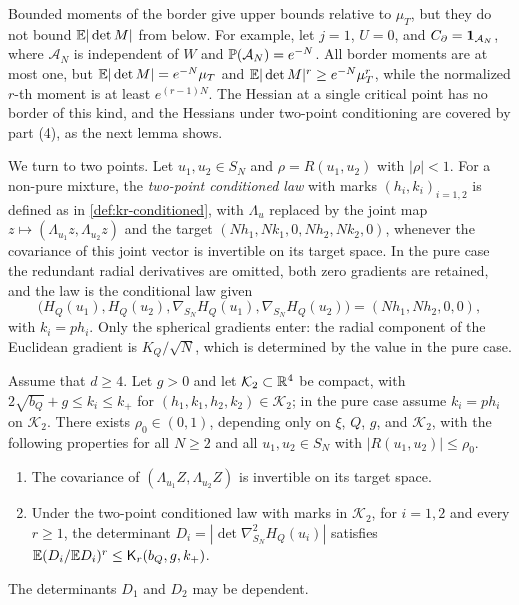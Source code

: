 \begin{remark}\label{rem:kr-border}
Bounded moments of the border give upper bounds relative to $\mu_T$, but they do not bound $\mathbb E|\det M|$ from below. For example, let $j=1$, $U=0$, and $C_\partial=\mathbf 1_{\mathcal A_N}$, where $\mathcal A_N$ is independent of $W$ and $\mathbb P(\mathcal A_N)=e^{-N}$. All border moments are at most one, but $\mathbb E|\det M|=e^{-N}\mu_T$ and $\mathbb E|\det M|^r\ge e^{-N}\mu_T^r$, while the normalized $r$-th moment is at least $e^{(r-1)N}$. The Hessian at a single critical point has no border of this kind, and the Hessians under two-point conditioning are covered by part (4), as the next lemma shows.
\end{remark}

We turn to two points. Let $u_1,u_2\in S_N$ and $\rho=R(u_1,u_2)$ with $|\rho|<1$. For a non-pure mixture, the \emph{two-point conditioned law} with marks $(h_i,k_i)_{i=1,2}$ is defined as in \cref{def:kr-conditioned}, with $\Lambda_u$ replaced by the joint map $z\mapsto(\Lambda_{u_1}z,\Lambda_{u_2}z)$ and the target $(Nh_1,Nk_1,0,Nh_2,Nk_2,0)$, whenever the covariance of this joint vector is invertible on its target space. In the pure case the redundant radial derivatives are omitted, both zero gradients are retained, and the law is the conditional law given
\[
\big(H_Q(u_1),H_Q(u_2),\nabla_{S_N}H_Q(u_1),\nabla_{S_N}H_Q(u_2)\big)=(Nh_1,Nh_2,0,0),
\]
with $k_i=ph_i$. Only the spherical gradients enter: the radial component of the Euclidean gradient is $K_Q/\sqrt N$, which is determined by the value in the pure case.

\begin{lemma}\label{lem:kr-two-point}
Assume that $d\ge4$. Let $g>0$ and let $\mathcal K_2\subset\mathbb R^4$ be compact, with $2\sqrt{b_Q}+g\le k_i\le k_+$ for $(h_1,k_1,h_2,k_2)\in\mathcal K_2$; in the pure case assume $k_i=ph_i$ on $\mathcal K_2$. There exists $\rho_0\in(0,1)$, depending only on $\xi$, $Q$, $g$, and $\mathcal K_2$, with the following properties for all $N\ge2$ and all $u_1,u_2\in S_N$ with $|R(u_1,u_2)|\le\rho_0$.
\begin{enumerate}
\item The covariance of $(\Lambda_{u_1}Z,\Lambda_{u_2}Z)$ is invertible on its target space.
\item Under the two-point conditioned law with marks in $\mathcal K_2$, for $i=1,2$ and every $r\ge1$, the determinant $D_i=|\det\nabla^2_{S_N}H_Q(u_i)|$ satisfies $\mathbb E(D_i/\mathbb E D_i)^r\le\mathsf K_r(b_Q,g,k_+)$.
\end{enumerate}
The determinants $D_1$ and $D_2$ may be dependent.
\end{lemma}

